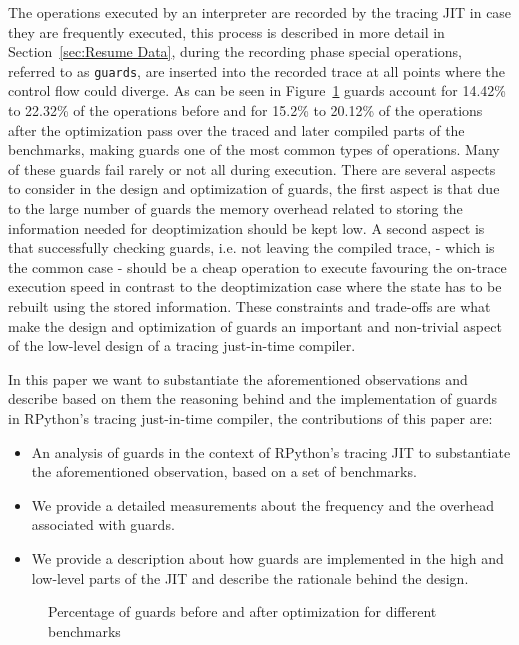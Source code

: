 \documentclass[10pt,preprint]{sigplanconf}
\begin{document}
The operations executed by an interpreter are recorded by the tracing JIT in
case they are frequently executed, this process is described in more detail in
Section~\ref{sec:Resume Data}, during the recording phase special operations,
referred to as \texttt{guards}, are inserted into the recorded trace at all
points where the control flow could diverge. As can be seen in
Figure~\ref{fig:guard_percent} guards account for 14.42\% to 22.32\% of the
operations before and for 15.2\% to 20.12\% of the operations after the
optimization pass over the traced and later compiled parts of the benchmarks,
making guards one of the most common types of operations. Many of these guards
fail rarely or not all during execution. There are several aspects to consider
in the design and optimization of guards, the first aspect is that due to the
large number of guards the memory overhead related to storing the information
needed for deoptimization should be kept low. A second aspect is that
successfully checking guards, i.e. not leaving the compiled trace,  - which is
the common case - should be a cheap operation to execute favouring the on-trace
execution speed in contrast to the deoptimization case where the state has to
be rebuilt using the stored information. These constraints and trade-offs are
what make the design and optimization of guards an important and non-trivial
aspect of the low-level design of a tracing just-in-time compiler.

In this paper we want to substantiate the aforementioned observations and
describe based on them the reasoning behind and the implementation of guards in
RPython's tracing just-in-time compiler, the contributions of this paper are:
\begin{itemize}
  \item An analysis of guards in the context of RPython's tracing JIT to
  substantiate the aforementioned observation, based on a set of benchmarks.
  \item We provide a detailed measurements about the frequency and the
  overhead associated with guards.
  \item We provide a description about how guards are implemented in the high\-
  and low-level parts of the JIT and describe the rationale behind the design.
\end{itemize}
\begin{figure}
    
    \caption{Percentage of guards before and after optimization for different benchmarks}
    \label{fig:guard_percent}
\end{figure}
\end{document}
